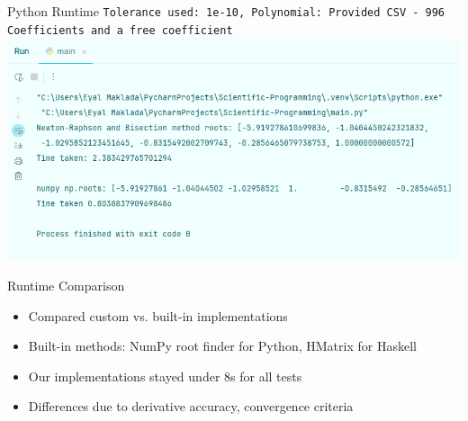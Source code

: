 \documentclass{beamer}
\begin{document}
\begin{frame}[fragile]{Python Runtime}
\texttt{Tolerance used: 1e-10, Polynomial: Provided CSV - 996 Coefficients and a free coefficient}
\includegraphics[width=1.0\textwidth]{python_runtime.png}
\end{frame}



\begin{frame}{Runtime Comparison}
\begin{itemize}
    \item Compared custom vs. built-in implementations
    \item Built-in methods: NumPy root finder for Python, HMatrix for Haskell
    \item Our implementations stayed under 8s for all tests
    \item Differences due to derivative accuracy, convergence criteria
\end{itemize}
\end{frame}
\end{document}
